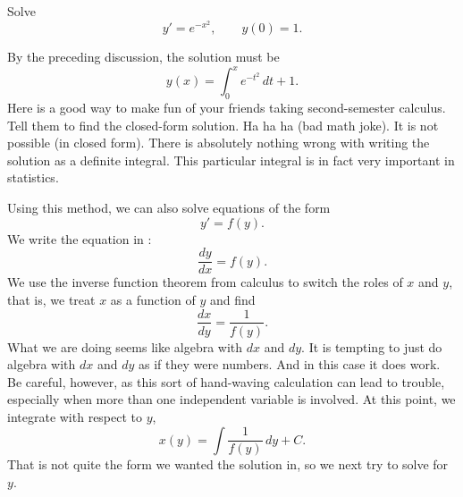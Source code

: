 \begin{example}
Solve
\begin{equation*}
y' = e^{-x^2}, \qquad y(0) = 1 .
\end{equation*}

By the preceding discussion, the solution must be
\begin{equation*}
y(x) = \int_0^x e^{-t^2} \,dt + 1 .
\end{equation*}
Here is a good way to make fun of your friends taking second-semester
calculus.  Tell them to
find the closed-form solution.  Ha ha ha (bad math joke).  It is
not possible (in closed form).
There is absolutely nothing wrong with writing the solution as a
definite integral.
This particular integral
is in fact very important
in statistics.
\end{example}

Using this method, we can also solve equations of the form
\begin{equation*}
y' = f(y) .
\end{equation*}
We write the equation in :
\begin{equation*}
\frac{dy}{dx} = f(y) .
\end{equation*}
We use the inverse function theorem from calculus
to switch the roles of $x$ and $y$, that is,
we treat $x$ as a function of $y$ and find
\begin{equation*}
\frac{dx}{dy} = \frac{1}{f(y)} .
\end{equation*}
What
we are doing seems like algebra with $dx$ and $dy$.
It is tempting to just do algebra with $dx$
and $dy$ as if they were numbers.  And in this case it does work.  Be
careful,
however, as this sort of hand-waving calculation can lead to trouble,
especially when
more than one independent variable is involved.
At this point, we integrate with respect to $y$,
\begin{equation*}
x(y) = \int \frac{1}{f(y)} \,dy + C .
\end{equation*}
That is not quite the form we wanted the solution in, so we
next try to solve for $y$.

